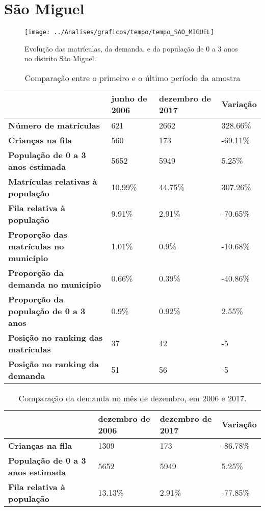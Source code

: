 \section{São Miguel}
\begin{figure}[H]
\centering
\texttt{[image: ../Analises/graficos/tempo/tempo\_SAO\_MIGUEL]}
\caption{Evolução das matrículas, da demanda, e da população de 0 a 3 anos no distrito São Miguel.}
\end{figure}
\begin{table}[H]
\begin{tabular}{|l|l|l|l|}
\hline
\textbf{}                                      & \textbf{junho de 2006}       & \textbf{dezembro de 2017}    & \textbf{Variação} \\ \hline
\textbf{Número de matrículas}                  & 621 & 2662 & 328.66\% \\ \hline
\textbf{Crianças na fila}                      & 560 & 173 & -69.11\% \\ \hline
\textbf{População de 0 a 3 anos estimada}      & 5652 & 5949 & 5.25\% \\ \hline
\textbf{Matrículas relativas à população}      & 10.99\% & 44.75\% & 307.26\% \\ \hline
\textbf{Fila relativa à população}             & 9.91\% & 2.91\% & -70.65\% \\ \hline
\textbf{Proporção das matrículas no município} & 1.01\% & 0.9\% & -10.68\% \\ \hline
\textbf{Proporção da demanda no município}     & 0.66\% & 0.39\% & -40.86\% \\ \hline
\textbf{Proporção da população de 0 a 3 anos}  & 0.9\% & 0.92\% & 2.55\% \\ \hline
\textbf{Posição no ranking das matrículas}     & 37 & 42 & -5 \\ \hline
\textbf{Posição no ranking da demanda}         & 51 & 56 & -5 \\ \hline
\end{tabular}
\caption{Comparação entre o primeiro e o último período da amostra}
\end{table}
\begin{table}[H]
\begin{tabular}{|l|l|l|l|}
\hline
\textbf{}                                 & \textbf{dezembro de 2006} & \textbf{dezembro de 2017} & \textbf{Variação} \\ \hline
\textbf{Crianças na fila}                      & 1309 & 173 & -86.78\% \\ \hline
\textbf{População de 0 a 3 anos estimada}      & 5652 & 5949 & 5.25\% \\ \hline
\textbf{Fila relativa à população}             & 13.13\% & 2.91\% & -77.85\% \\ \hline
\end{tabular}
\caption{Comparação da demanda no mês de dezembro, em 2006 e 2017.}
\end{table}
